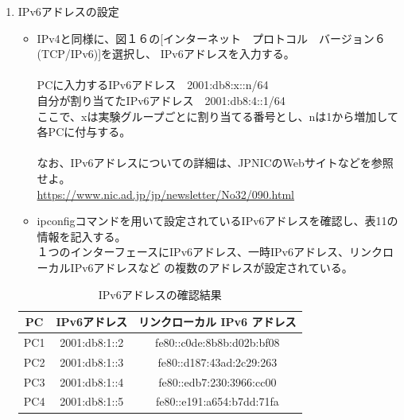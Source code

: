 \documentclass[10pt]{article}
\begin{document}
\begin{enumerate}
    \item IPv6アドレスの設定
        \begin{itemize}
            \item IPv4と同様に、図１６の[インターネット　プロトコル　バージョン６(TCP/IPv6)]を選択し、
                IPv6アドレスを入力する。\\\\
                PCに入力するIPv6アドレス　2001:db8:x::n/64 \\
                自分が割り当てたIPv6アドレス　2001:db8:4::1/64 \\
                \text{*}ここで、xは実験グループごとに割り当てる番号とし、nは1から増加して各PCに付与する。\\\\
                なお、IPv6アドレスについての詳細は、JPNICのWebサイトなどを参照せよ。\\
                \underline{https://www.nic.ad.jp/jp/newsletter/No32/090.html}
            \item ipconfigコマンドを用いて設定されているIPv6アドレスを確認し、表11の情報を記入する。 \\
                １つのインターフェースにIPv6アドレス、一時IPv6アドレス、リンクローカルIPv6アドレスなど
                の複数のアドレスが設定されている。 
        \end{itemize}
                \begingroup
                \setlength{\tabcolsep}{5pt} %
                \renewcommand{\arraystretch}{1.5} %
                    \begin{table}[H]
                    \centering
                	\caption{IPv6アドレスの確認結果 }
                	\begin{tabular}{|c|c|c|}
                	    \hline
                	    PC & IPv6アドレス & リンクローカル IPv6 アドレス \\[0.5ex]
                		\hline\hline
                    	PC1 & 2001:db8:1::2 & fe80::c0de:8b8b:d02b:bf08 \\ \hline
                    	PC2 & 2001:db8:1::3 & fe80::d187:43ad:2c29:263 \\ \hline
                    	PC3 & 2001:db8:1::4 & fe80::edb7:230:3966:cc00 \\ \hline
                    	PC4 & 2001:db8:1::5 & fe80::e191:a654:b7dd:71fa \\ \hline
                	\end{tabular}
                    \end{table} 

\end{enumerate}
\end{document}
